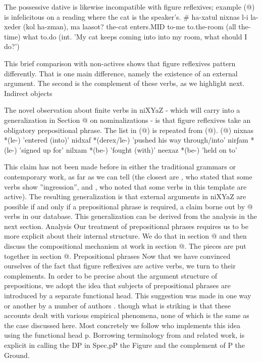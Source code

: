 The possessive dative is likewise incompatible with figure reflexives; example (@) is infelicitous on a reading where the cat is the speaker's.
        \# ha-xatul nixnas l-i la-xeder (kol ha-zman), ma laasot?
         the-cat enters.MID to-me to.the-room (all the-time) what to.do
         (int. 'My cat keeps coming into into my room, what should I do?')

This brief comparison with non-actives shows that figure reflexives pattern differently. That is one main difference, namely the existence of an external argument. The second is the complement of these verbs, as we highlight next.
Indirect objects

The novel observation about finite verbs in niXYaZ - which will carry into a generalization in Section @ on nominalizations - is that figure reflexives take an obligatory prepositional phrase. The list in (@) is repeated from (@).
(@)     nixnas  *(le-)  'entered (into)' 
        nidxaf  *(derex/le-)  'pushed his way through/into' 
        nirʃam  *(le-)  'signed up for' 
        nilxam  *(be-)  'fought (with)' 
        neexaz  *(be-)  'held on to' 

This claim has not been made before in either the traditional grammars or contemporary work, as far as we can tell (the closest are \citet[87]{berman78}, who stated that some verbs show ''ingression'', and \cite{schwarzwald08}, who noted that some verbs in this template are active). The resulting generalization is that external arguments in niXYaZ are possible if and only if a prepositional phrase is required, a claim borne out by @ verbs in our database. This generalization can be derived from the analysis in the next section.
Analysis
Our treatment of prepositional phrases requires us to be more explicit about their internal structure. We do that in section @ and then discuss the compositional mechanism at work in section @. The pieces are put together in section @.
Prepositional phrases
Now that we have convinced ourselves of the fact that figure reflexives are active verbs, we turn to their complements. In order to be precise about the argument structure of prepositions, we adopt the idea that subjects of prepositional phrases are introduced by a separate functional head. This suggestion was made in one way or another by a number of authors \citep{vanriemsdijk90,rooryck96,koopman97,gehrke08phd,dendikken03,dendikken10}. though what is striking is that these accounts dealt with various empirical phenomena, none of which is the same as the case discussed here. Most concretely we follow \cite{svenonius03,svenonius07,svenonius10} who implements this idea using the functional head p. Borrowing terminology from \cite{talmy78} and related work, \cite{wood14nllt} is explicit in calling the DP in Spec,pP the Figure and the complement of P the Ground.

